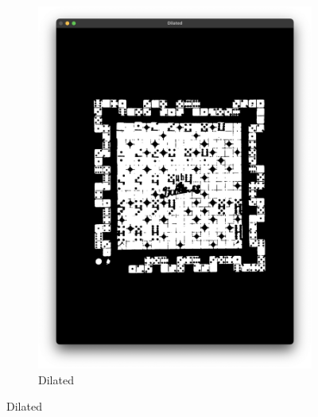 \documentclass[12pt]{article}
\begin{document}
\begin{figure}[!h]
\begin{subfigure}{.5\textwidth}
            \includegraphics[width=0.9\linewidth]
            {images/board_extraction/dilated.png}
            \caption{Dilated}
            \label{fig:be-dilated}
        \end{subfigure}
    \end{figure}
\end{document}
